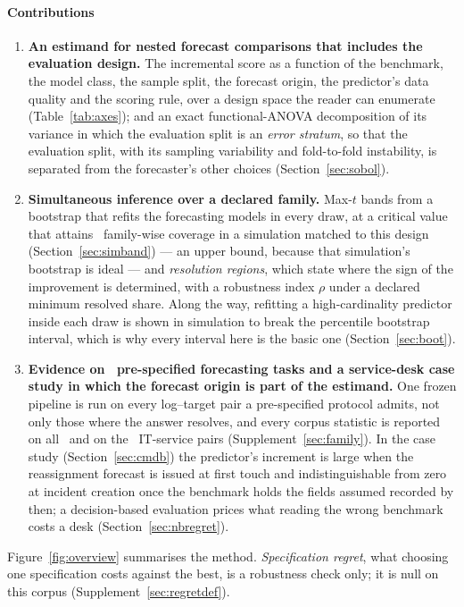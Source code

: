 \paragraph{Contributions}
\begin{enumerate}
\item \textbf{An estimand for nested forecast comparisons that includes the
evaluation design.} The incremental score as a function of the benchmark,
the model class, the sample split, the forecast origin, the predictor's data
quality and the scoring rule, over a design space the reader can enumerate
(Table~\ref{tab:axes}); and an exact functional-ANOVA decomposition of its
variance in which the evaluation split is an \emph{error stratum}, so that
the evaluation split, with its sampling variability and fold-to-fold
instability, is separated from the forecaster's other choices
(Section~\ref{sec:sobol}).
\item \textbf{Simultaneous inference over a declared family.} Max-$t$ bands
from a bootstrap that refits the forecasting models in every draw, at a
critical value that attains \covEmpHeavyWholeAtDesign\ family-wise coverage
in a simulation matched to this design (Section~\ref{sec:simband}) --- an
upper bound, because that simulation's bootstrap is ideal --- and \emph{resolution
regions}, which state where the sign of the improvement is determined, with a
robustness index $\rho$ under a declared minimum resolved share. Along the
way, refitting a high-cardinality predictor inside each draw is shown in
simulation to break the percentile bootstrap interval, which is why every
interval here is the basic one (Section~\ref{sec:boot}).
\item \textbf{Evidence on \nPairs\ pre-specified forecasting tasks and a
service-desk case study in which the forecast origin is part of the
estimand.} One frozen pipeline is run on every log--target pair a pre-specified
protocol admits, not only those where the answer resolves, and every corpus
statistic is reported on all \nPairs\ and on the \nItsmPairs\ IT-service
pairs (Supplement~\ref{sec:family}). In the case study
(Section~\ref{sec:cmdb}) the predictor's increment is large when the
reassignment forecast is issued at first touch and indistinguishable from
zero at incident creation once the benchmark holds the fields assumed recorded
by then; a decision-based evaluation prices what reading the wrong benchmark
costs a desk (Section~\ref{sec:nbregret}).
\end{enumerate}

\noindent Figure~\ref{fig:overview} summarises the method.
\emph{Specification regret}, what choosing one specification costs against
the best, is a robustness check only; it is null on this corpus
(Supplement~\ref{sec:regretdef}).

